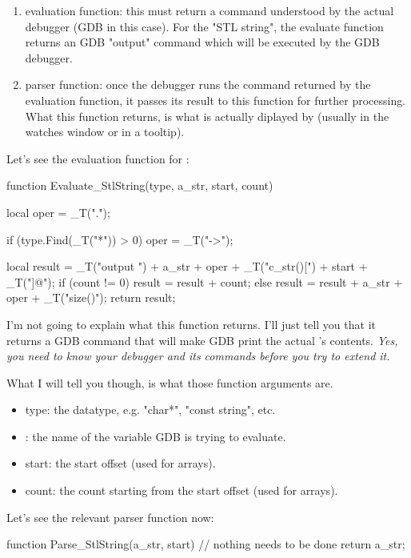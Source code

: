 \begin{enumerate}
\item evaluation function: this must return a command understood by the actual debugger (GDB in this case). For the "STL string", the evaluate function returns an GDB "output" command which will be executed by the GDB debugger.
\item parser function: once the debugger runs the command returned by the evaluation function, it passes its result to this function for further processing. What this function returns, is what is actually diplayed by \codeblocks (usually in the watches window or in a tooltip).
\end{enumerate}


Let's see the evaluation function for :

\begin{code}
function Evaluate_StlString(type, a_str, start, count)
{
    local oper = _T(".");

    if (type.Find(_T("*")) > 0)
        oper = _T("->");

    local result = _T("output ") + a_str + oper + _T("c_str()[") + start + _T("]@");
    if (count != 0)
        result = result + count;
    else
        result = result + a_str + oper + _T("size()");
    return result;
}
\end{code}

I'm not going to explain what this function returns. I'll just tell you that it returns a GDB command that will make GDB print the actual 's contents. \textit{Yes, you need to know your debugger and its commands before you try to extend it.}

What I will tell you though, is what those function arguments are.

\begin{itemize}
\item type: the datatype, e.g. "char*", "const string", etc.
\item {}: the name of the variable GDB is trying to evaluate.
\item start: the start offset (used for arrays).
\item count: the count starting from the start offset (used for arrays).
\end{itemize}

Let's see the relevant parser function now:

\begin{code}
function Parse_StlString(a_str, start)
{
    // nothing needs to be done
    return a_str;
}
\end{code}

